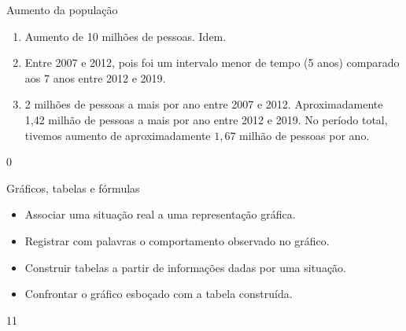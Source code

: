 \begin{answer}{Aumento da população}
{
\begin{enumerate}
\item Aumento de 10 milhões de pessoas. Idem.
\item Entre 2007 e 2012, pois foi um intervalo menor de tempo (5 anos) comparado aos 7 anos entre 2012 e 2019.
\item 2 milhões de pessoas a mais por ano entre 2007 e 2012. Aproximadamente 1,42 milhão de pessoas a mais por ano entre 2012 e 2019. No período total, tivemos aumento de aproximadamente $1{,}67$ milhão de pessoas por ano.
\end{enumerate}
}{0}
\end{answer}
\begin{objectives}{Gráficos, tabelas e fórmulas}
{
\begin{itemize}

\item Associar uma situação real a uma representação gráfica.

\item Registrar com palavras o comportamento observado no gráfico.

\item Construir tabelas a partir de informações dadas por uma situação.

\item Confrontar o gráfico esboçado com a tabela construída.

\end{itemize}
}{1}{1}
\end{objectives}
